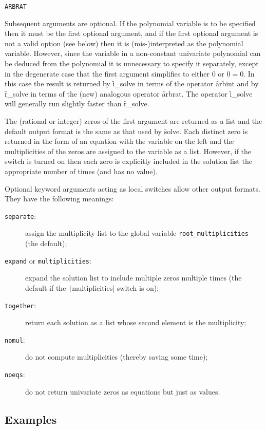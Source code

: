 \hypertarget{operator:ARBRAT}{\texttt{ARBRAT}}
Subsequent arguments are optional.  If the polynomial variable is to
be specified then it must be the first optional argument, and if the
first optional argument is not a valid option (see below) then it is
(mis-)interpreted as the polynomial variable.  However, since the
variable in a non-constant univariate polynomial can be deduced from
the polynomial it is unnecessary to specify it separately, except in
the degenerate case that the first argument simplifies to either 0 or
$0 = 0$.  In this case the result is returned by \f{i\_solve} in
terms of the operator \f{arbint} and by \f{r\_solve} in terms of
the (new) analogous operator \f{arbrat}.  The operator
\f{i\_solve} will generally run slightly faster than \f{r\_solve}.

The (rational or integer) zeros of the first argument are returned as
a list and the default output format is the same as that used by
\f{solve}.  Each distinct zero is returned in the form of an
equation with the variable on the left and the multiplicities of the
zeros are assigned to the variable  as a
list.  However, if the switch  is turned on then
each zero is explicitly included in the solution list the appropriate
number of times (and  has no value).

\begin{sloppypar}
Optional keyword arguments acting as local switches allow other output
formats.  They have the following meanings:
\begin{description}
\item[\texttt{separate}:] assign the multiplicity list to the global
  variable \texttt{root\_multiplicities} (the default);
\item[\texttt{expand} \textnormal{or} \texttt{multiplicities}:] expand the solution
  list to include multiple zeros multiple times (the default if the
  \texttt|multiplicities| switch is on);
\item[\texttt{together}:] return each solution as a list whose second
  element is the multiplicity;
\item[\texttt{nomul}:] do not compute multiplicities (thereby saving
  some time);
\item[\texttt{noeqs}:] do not return univariate zeros as equations but
  just as values.
\end{description}
\end{sloppypar}


\subsection{Examples}

